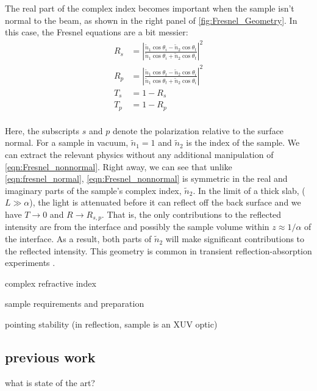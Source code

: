 The real part of the complex index becomes important when the sample isn't normal to the beam, as shown in the right panel of \cref{fig:Fresnel_Geometry}. In this case, the Fresnel equations are a bit messier:
\begin{equation}
\begin{aligned}
R_s &= \left| \frac{\tilde{n}_1 \cos \theta_i - \tilde{n}_2 \cos \theta_t}{\tilde{n}_1 \cos \theta_i + \tilde{n}_2 \cos \theta_t}  \right|^2 \\
R_p &= \left| \frac{\tilde{n}_1 \cos \theta_t - \tilde{n}_2 \cos \theta_i}{\tilde{n}_1 \cos \theta_t + \tilde{n}_2 \cos \theta_i}  \right|^2 \\
T_s &= 1 - R_s \\
T_p &= 1 - R_p \\
\end{aligned}
\label{eqn:Fresnel_nonnormal}
\end{equation}

Here, the subscripts $s$ and $p$ denote the polarization relative to the surface normal. For a sample in vacuum, $\tilde{n}_1=1$ and $\tilde{n}_2$ is the index of the sample. We can extract the relevant physics without any additional manipulation of \cref{eqn:Fresnel_nonnormal}. Right away, we can see that unlike \cref{eqn:fresnel_normal}, \cref{eqn:Fresnel_nonnormal} is symmetric in the real and imaginary parts of the sample's complex index, $\tilde{n}_2$. In the limit of a thick slab, ($L \gg \alpha$), the light is attenuated before it can reflect off the back surface and we have $T \rightarrow 0$ and $R \rightarrow R_{s,p}$. That is, the only contributions to the reflected intensity are from the interface and possibly the sample volume within $z \approx 1/\alpha$ of the interface. As a result, both parts of $\tilde{n}_2$ will make significant contributions to the reflected intensity. This geometry is common in transient reflection-absorption experiments \cite{cirriAchievingSurfaceSensitivity2017,kaplanFemtosecondTrackingCarrier2018}.



complex refractive index

sample requirements and preparation

pointing stability (in reflection, sample is an XUV optic)

\subsection{previous work}
what is state of the art?

